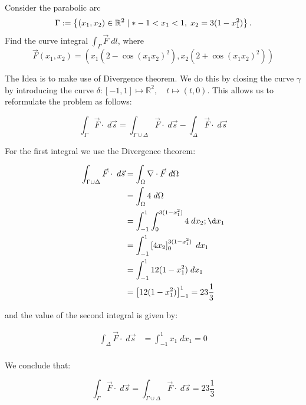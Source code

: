 \documentclass[11pt]{article}
\begin{document}
\begin{exercise}
    Consider the parabolic arc 
    \[
        \Gamma := \left\{ (x_1,x_2) \in \bbR^{2} \suchthat* -1 < x_1 < 1, \; x_2 = 3 ( 1 - x_1^2 ) \right\}.
    \]
    Find the curve integral $\int_\Gamma \vec F \;dl$, where 
    \[
        \vec F(x_1,x_2) = \left( x_1 ( 2 - \cos(x_1x_2)^{2} ), x_2 ( 2 + \cos(x_1x_2)^{2} ) \right)
    \]
\end{exercise}
\begin{solution}

The Idea is to make use of Divergence theorem. We do this by closing the curve $\gamma$ by introducing the curve $\delta: [-1,1] \mapsto \mathbb{R}^2, \quad t\mapsto  (t,0)$. This allows us to reformulate the problem as follows:

$$
\int_{\Gamma} \vec{F} \cdot \; d\vec{s} = \int_{\Gamma\cup \Delta} \vec{F} \cdot 
\; d\vec{s}-\int_{\Delta} \vec{F}\cdot \;d \vec{s}
$$

For the first integral we use the Divergence theorem:

\begin{align*}
\int_{\Gamma\cup\Delta} \vec{F} \cdot 
\; d\vec{s} &= \int_{\Omega} \nabla\cdot\vec{F}\;d \Omega\\
&=\int_{\Omega} 4\;d \Omega\\
&=\int_{-1}^1\int_{0}^{3(1-x_1^2)} 4 \;d x_2 ;\d x_1\\
&=\int_{-1}^1\left[4x_2\right]_{0}^{3(1-x_1^2)}  \;d x_1\\
&=\int_{-1}^1 12( 1-x_1^2)\;d x_1\\
&=\left[12( 1-x_1^2)\right]_{-1}^1 = 23\frac{1}{3}\\
\end{align*}

and the value of the second integral is given by:

\begin{align*}
\int_{\Delta} \vec{F} \cdot 
\; d\vec{s} &= \int_{-1}^1 x_1 
\; dx_1 =0\\
\end{align*}

We conclude that:

$$
\int_{\Gamma} \vec{F} \cdot \; d\vec{s} = \int_{\Gamma\cup \Delta} \vec{F} \cdot 
\; d\vec{s} = 23\frac{1}{3}
$$

\end{solution}
\end{document}
